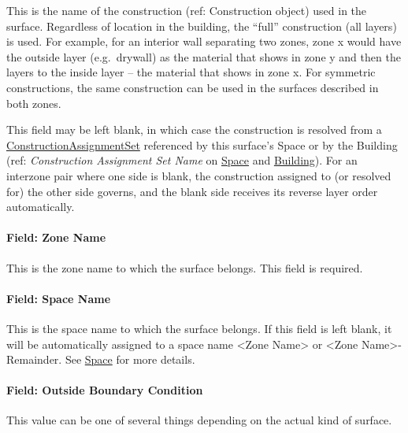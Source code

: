 This is the name of the construction (ref: Construction object) used in the surface. Regardless of location in the building, the ``full'' construction (all layers) is used. For example, for an interior wall separating two zones, zone x would have the outside layer (e.g.~drywall) as the material that shows in zone y and then the layers to the inside layer -- the material that shows in zone x. For symmetric constructions, the same construction can be used in the surfaces described in both zones.

This field may be left blank, in which case the construction is resolved from a \hyperref[constructionassignmentset]{ConstructionAssignmentSet} referenced by this surface's Space or by the Building (ref: \emph{Construction Assignment Set Name} on \hyperref[space]{Space} and \hyperref[building]{Building}). For an interzone pair where one side is blank, the construction assigned to (or resolved for) the other side governs, and the blank side receives its reverse layer order automatically.

\paragraph{Field: Zone Name}\label{field-zone-name-13}

This is the zone name to which the surface belongs. This field is required.

\paragraph{Field: Space Name}\label{field-space-name-13}

This is the space name to which the surface belongs. If this field is left blank, it will be automatically assigned to a space name <Zone Name> or <Zone Name>-Remainder. See \hyperref[space]{Space} for more details.

\paragraph{Field: Outside Boundary Condition}\label{field-outside-boundary-condition-3}

This value can be one of several things depending on the actual kind of surface.

